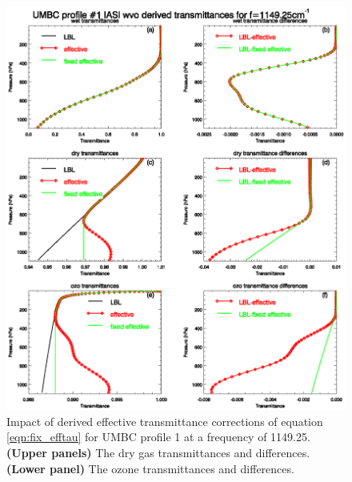 \begin{figure}[htp]
  \centering
  \includegraphics[bb=70 130 540 480,clip,scale=0.8]{graphics/wvo_efftaus_1149.25cm-1.eps}
  \caption{Impact of  derived effective transmittance corrections of equation \ref{eqn:fix_efftau} for UMBC profile 1 at a frequency of 1149.25\invcm. \textbf{(Upper panels)} The dry gas transmittances and differences. \textbf{(Lower panel)} The ozone transmittances and differences.}
  \label{fig:wvo_efftaus_1149.25cm-1}
\end{figure}
